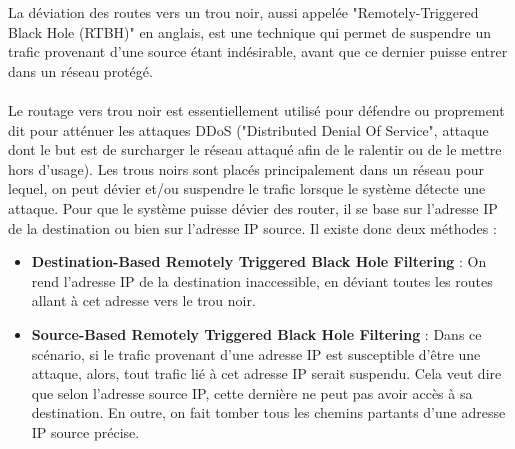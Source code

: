La déviation des routes vers un trou noir, aussi appelée "Remotely-Triggered Black Hole (RTBH)" en anglais, est une technique qui permet de suspendre un trafic provenant d'une source étant indésirable, avant que ce dernier puisse entrer dans un réseau protégé.
\\
\\
Le routage vers trou noir est essentiellement utilisé pour défendre ou proprement dit pour atténuer les attaques DDoS ("Distributed Denial Of Service", attaque dont le but est de surcharger le réseau attaqué afin de le ralentir ou de le mettre hors d'usage). Les trous noirs sont placés principalement dans un réseau pour lequel, on peut dévier et/ou suspendre le trafic lorsque le système détecte une attaque. 
\newline
Pour que le système puisse dévier des router, il se base sur l'adresse IP de la destination ou bien sur l'adresse IP source. Il existe donc deux méthodes :
\pagebreak
\begin{itemize}
\item \textbf{Destination-Based Remotely Triggered Black Hole Filtering } : On rend l'adresse IP de la destination inaccessible, en déviant toutes les routes allant à cet adresse vers le trou noir.
\item \textbf{Source-Based Remotely Triggered Black Hole Filtering }
: Dans ce scénario, si le trafic provenant d'une adresse IP est susceptible d'être une attaque, alors, tout trafic lié à cet adresse IP serait suspendu. Cela veut dire que selon l'adresse source IP, cette dernière ne peut pas avoir accès à sa destination. En outre, on fait tomber tous les chemins partants d'une adresse IP source précise.   
\end{itemize}


